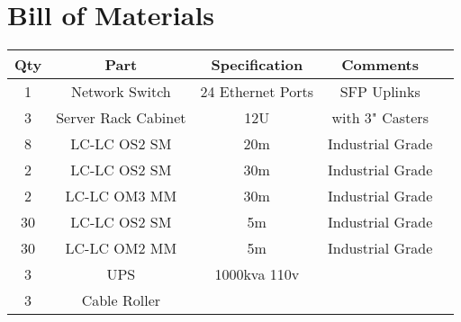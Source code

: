 \newpage

\section{Bill of Materials}

\begin{tabular}{|c|c|c|c|c|}
  \hline
  Qty & Part  & Specification &  Comments \\ 
  \hline


  1 & Network Switch & 24 Ethernet Ports &  SFP Uplinks \\ 
  \hline

  3 & Server Rack Cabinet& 12U & with 3" Casters  \\ 
  \hline

  8 & LC-LC OS2 SM & 20m & Industrial Grade  \\ 
  \hline

  2 & LC-LC OS2 SM & 30m & Industrial Grade  \\ 
  \hline

  2 & LC-LC OM3 MM & 30m & Industrial Grade  \\ 
  \hline

  30 & LC-LC OS2 SM & 5m & Industrial Grade  \\ 
  \hline

  30 & LC-LC OM2 MM & 5m & Industrial Grade  \\ 
  \hline

    
  3 &  UPS & 1000kva 110v   &  \\ 
  \hline
  
  3 & Cable Roller  &   &     \\ 
  \hline


  \end{tabular}